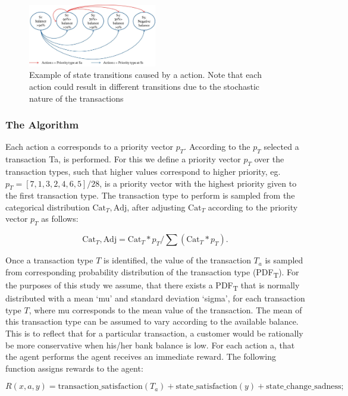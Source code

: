 \documentclass[]{article}
\begin{document}
\begin{figure}
\centering
\includegraphics[width=0.5\textwidth]{uploads/upload_d7d1576051453ce269f98a5c597e8bd0.jpg}
\caption{Example of state transitions caused by a action. Note that
each action could result in different transitions due to the stochastic
nature of the transactions}
\end{figure}

\subsubsection{The Algorithm}\label{the-algorithm}

Each action a corresponds to a priority vector $p_T$. According to the $p_T$
selected a transaction Ta, is performed. For this we define a priority
vector $p_T$ over the transaction types, such that higher values correspond
to higher priority, eg. $p_T = [7, 1, 3, 2, 4, 6, 5]/28$, is a priority
vector with the highest priority given to the first transaction type.
The transaction type to perform is sampled from the categorical
distribution $\text{Cat}_T,\text{Adj}$, after adjusting $\text{Cat}_T$ according to the priority
vector $p_T$ as follows:

$$\text{Cat}_T,\text{Adj} = \text{Cat}_T * p_T / \sum (\text{Cat}_T * p_T).$$

Once a transaction type $T$ is identified, the value of the transaction $T_a$
is sampled from corresponding probability distribution of the
transaction type (PDF\textsubscript{T}). For the purposes of this study we assume, that
there exists a PDF\textsubscript{T} that is normally distributed with a mean `mu' and
standard deviation `sigma', for each transaction type $T$, where mu
corresponds to the mean value of the transaction. The mean of this
transaction type can be assumed to vary according to the available
balance. This is to reflect that for a particular transaction, a
customer would be rationally be more conservative when his/her bank
balance is low. For each action a, that the agent performs the agent
receives an immediate reward. The following function assigns rewards to
the agent:

$$R(x,a,y) = \text{transaction\_satisfaction}(T_a) + \text{state\_satisfaction}(y) +
\text{state\_change\_sadness}; $$
\end{document}
